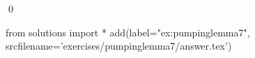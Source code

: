 
\begin{ex} 
  \label{ex:pumpinglemma7}
  
  \qed
\end{ex} 
\begin{python0}
from solutions import *
add(label="ex:pumpinglemma7",
    srcfilename='exercises/pumpinglemma7/answer.tex') 
\end{python0}
